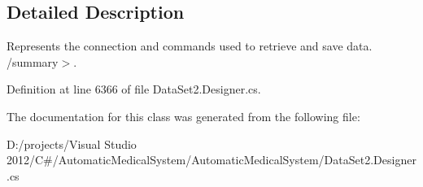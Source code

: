 \subsection{Detailed Description}
Represents the connection and commands used to retrieve and save data. /summary$>$. 

Definition at line 6366 of file DataSet2.Designer.cs.

The documentation for this class was generated from the following file:\begin{CompactItemize}
\item 
D:/projects/Visual Studio 2012/C\#/AutomaticMedicalSystem/AutomaticMedicalSystem/DataSet2.Designer.cs\end{CompactItemize}

